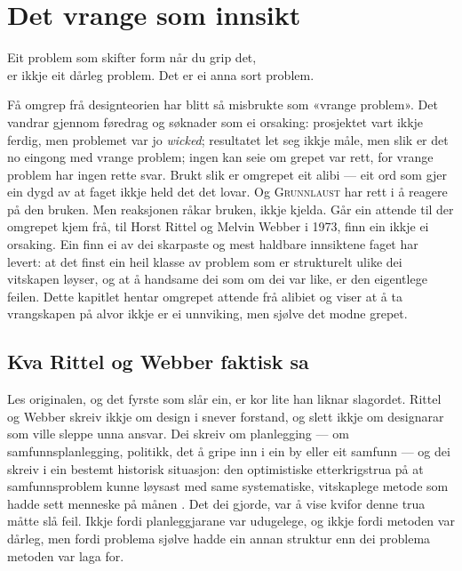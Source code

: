 \chapter{Det vrange som innsikt}

\begin{motto}
Eit problem som skifter form når du grip det,\\ er ikkje eit dårleg problem. Det er ei anna sort problem.
\end{motto}

Få omgrep frå designteorien har blitt så misbrukte som «vrange problem». Det vandrar gjennom føredrag og søknader som ei orsaking: prosjektet vart ikkje ferdig, men problemet var jo \emph{wicked}; resultatet let seg ikkje måle, men slik er det no eingong med vrange problem; ingen kan seie om grepet var rett, for vrange problem har ingen rette svar. Brukt slik er omgrepet eit alibi — eit ord som gjer ein dygd av at faget ikkje held det det lovar. Og \textsc{Grunnlaust} har rett i å reagere på den bruken. Men reaksjonen råkar bruken, ikkje kjelda. Går ein attende til der omgrepet kjem frå, til Horst Rittel og Melvin Webber i 1973, finn ein ikkje ei orsaking. Ein finn ei av dei skarpaste og mest haldbare innsiktene faget har levert: at det finst ein heil klasse av problem som er strukturelt ulike dei vitskapen løyser, og at å handsame dei som om dei var like, er den eigentlege feilen. Dette kapitlet hentar omgrepet attende frå alibiet og viser at å ta vrangskapen på alvor ikkje er ei unnviking, men sjølve det modne grepet.

\section{Kva Rittel og Webber faktisk sa}

Les originalen, og det fyrste som slår ein, er kor lite han liknar slagordet. Rittel og Webber skreiv ikkje om design i snever forstand, og slett ikkje om designarar som ville sleppe unna ansvar. Dei skreiv om planlegging — om samfunnsplanlegging, politikk, det å gripe inn i ein by eller eit samfunn — og dei skreiv i ein bestemt historisk situasjon: den optimistiske etterkrigstrua på at samfunnsproblem kunne løysast med same systematiske, vitskaplege metode som hadde sett menneske på månen \autocite{rittel1973}. Det dei gjorde, var å vise kvifor denne trua måtte slå feil. Ikkje fordi planleggjarane var udugelege, og ikkje fordi metoden var dårleg, men fordi problema sjølve hadde ein annan struktur enn dei problema metoden var laga for.

